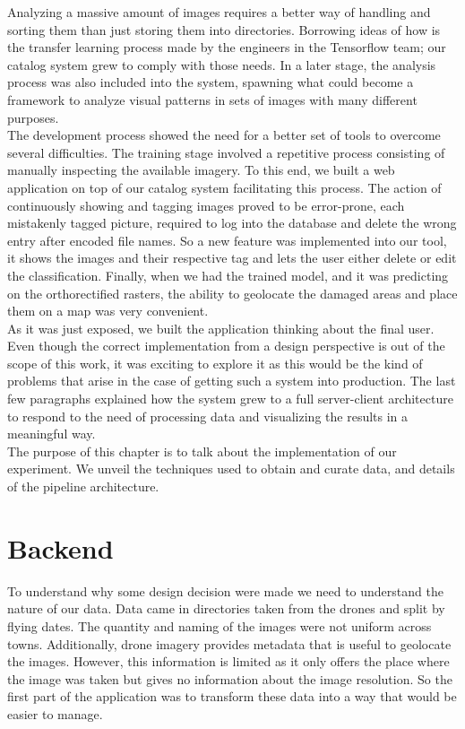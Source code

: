 Analyzing a massive amount of images requires a better way of handling and sorting them than just storing them into directories. Borrowing ideas of how is the transfer learning process made by the engineers in the Tensorflow team; our catalog system grew to comply with those needs. In a later stage, the analysis process was also included into the system, spawning what could become a framework to analyze visual patterns in sets of images with many different purposes.\\

The development process showed the need for a better set of tools to overcome several difficulties. The training stage involved a repetitive process consisting of manually inspecting the available imagery. To this end, we built a web application on top of our catalog system facilitating this process. The action of continuously showing and tagging images proved to be error-prone, each mistakenly tagged picture, required to log into the database and delete the wrong entry after encoded file names. So a new feature was implemented into our tool, it shows the images and their respective tag and lets the user either delete or edit the classification. Finally, when we had the trained model, and it was predicting on the orthorectified rasters, the ability to geolocate the damaged areas and place them on a map was very convenient.\\


As it was just exposed, we built the application thinking about the final user. Even though the correct implementation from a design perspective is out of the scope of this work, it was exciting to explore it as this would be the kind of problems that arise in the case of getting such a system into production. The last few paragraphs explained how the system grew to a full server-client architecture to respond to the need of processing data and visualizing the results in a meaningful way.\\

The purpose of this chapter is to talk about the implementation of our experiment. We unveil the techniques used to obtain and curate data, and details of the pipeline architecture.\\

\section{Backend}

To understand why some design decision were made we need to understand the nature of our data. Data came in directories taken from the drones and split by flying dates. The quantity and naming of the images were not uniform across towns. Additionally, drone imagery provides metadata that is useful to geolocate the images. However, this information is limited as it only offers the place where the image was taken but gives no information about the image resolution. So the first part of the application was to transform these data into a way that would be easier to manage.\\



